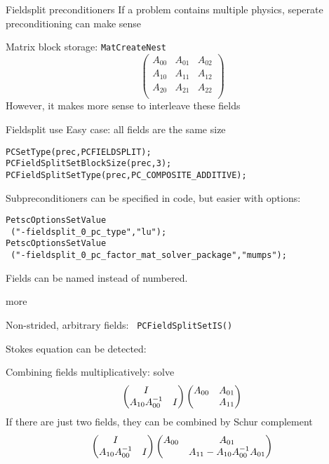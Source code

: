 \begin{numberedframe}{Fieldsplit preconditioners}
If a problem contains multiple physics, seperate preconditioning can
make sense

Matrix block storage: \lstinline{MatCreateNest}
\[ 
\begin{pmatrix}
  A_{00}&A_{01}&A_{02}\\ A_{10}&A_{11}&A_{12}\\ A_{20}&A_{21}&A_{22}\\ 
\end{pmatrix}
\]
However, it makes more sense to interleave these fields
\end{numberedframe}

\begin{numberedframe}{Fieldsplit use}
Easy case: all fields are the same size
\begin{lstlisting}
PCSetType(prec,PCFIELDSPLIT);
PCFieldSplitSetBlockSize(prec,3);
PCFieldSplitSetType(prec,PC_COMPOSITE_ADDITIVE);
\end{lstlisting}
Subpreconditioners can be specified in code, but easier with options:
\begin{lstlisting}
PetscOptionsSetValue
 ("-fieldsplit_0_pc_type","lu");
PetscOptionsSetValue
 ("-fieldsplit_0_pc_factor_mat_solver_package","mumps");
\end{lstlisting}
Fields can be named instead of numbered.
\end{numberedframe}

\begin{numberedframe}{more}

Non-strided, arbitrary fields: \lstinline{ PCFieldSplitSetIS()}

Stokes equation can be detected:

Combining fields multiplicatively: solve
\[ 
\begin{pmatrix} I\\ A_{10}A_{00}^{-1}&I \end{pmatrix}
\begin{pmatrix} A_{00}&A_{01}\\ &A_{11} \end{pmatrix}
\]
If there are just two fields, they can be combined by Schur complement
\[ 
\begin{pmatrix} I\\ A_{10}A_{00}^{-1}&I \end{pmatrix}
\begin{pmatrix} A_{00}&A_{01}\\ &A_{11}-A_{10}A_{00}^{-1} A_{01} \end{pmatrix}
\]
\end{numberedframe}

